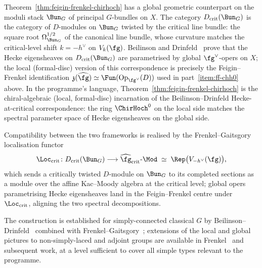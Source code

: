 \begin{remark}%
\label{rem:twisted-d-mod-critical-level}%
%
%
%
%
Theorem~\ref{thm:feigin-frenkel-chirhoch} has a global geometric
counterpart on the moduli stack $\Bun_G$ of principal $G$-bundles on
$X$. The category $D_{\mathrm{crit}}(\Bun_G)$ is the category of
$D$-modules on $\Bun_G$ twisted by the critical line bundle: the
square root $\Omega^{1/2}_{\Bun_G}$ of the canonical line bundle, whose
curvature matches the critical-level shift $k=-h^\vee$ on $V_k(\fg)$.
Beilinson and Drinfeld~\cite[Chapter~7]{BD04} prove that the
Hecke eigensheaves on $D_{\mathrm{crit}}(\Bun_G)$ are parametrised by
global $\fg^\vee$-opers on $X$; the local (formal-disc) version of this
correspondence is precisely the Feigin--Frenkel identification
$\mathfrak z(\widehat\fg)\simeq\Fun(\mathrm{Op}_{\fg^\vee}(D))$ used in
part~\ref{item:ff-chh0} above. In the programme's language,
Theorem~\ref{thm:feigin-frenkel-chirhoch} is the chiral-algebraic
(local, formal-disc) incarnation of the Beilinson--Drinfeld
Hecke-at-critical correspondence: the ring $\ChirHoch^0$ on the local
side matches the spectral parameter space of Hecke eigensheaves on the
global side.

Compatibility between the two frameworks is realised by the
Frenkel--Gaitsgory localisation
functor~\cite{FG06,FrenkelLanglands}
\[
\Loc_{\mathrm{crit}}\colon D_{\mathrm{crit}}(\Bun_G)\longrightarrow
\widehat{\fg}_{\mathrm{crit}}\text{-}\Mod
\;\simeq\;\Rep\bigl(V_{-h^\vee}(\fg)\bigr),
\]
which sends a critically twisted $D$-module on $\Bun_G$ to its
completed sections as a module over the affine Kac--Moody algebra at
the critical level; global opers parametrising Hecke eigensheaves land
in the Feigin--Frenkel centre under $\Loc_{\mathrm{crit}}$, aligning
the two spectral decompositions.

The construction is established for simply-connected classical $G$ by
Beilinson--Drinfeld~\cite{BD04} combined with
Frenkel--Gaitsgory~\cite{FG06}; extensions of the local and global
pictures to non-simply-laced and adjoint groups are available in
Frenkel~\cite{FrenkelLanglands} and subsequent work, at a level
sufficient to cover all simple types relevant to the programme.
\end{remark}

